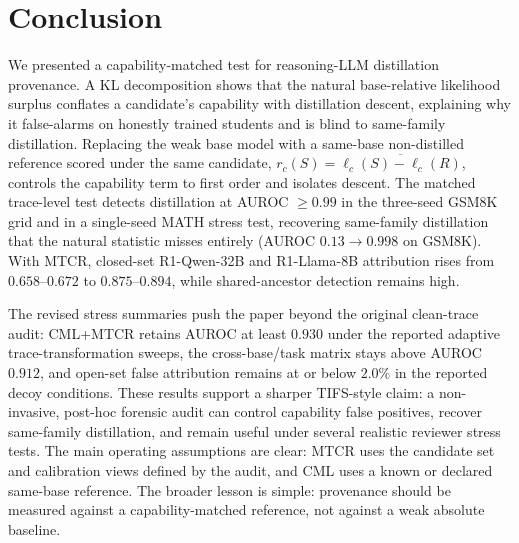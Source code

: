 \section{Conclusion}
\label{sec:conclusion}
We presented a capability-matched test for reasoning-LLM distillation provenance. A
KL decomposition shows that the natural base-relative likelihood surplus conflates a
candidate's capability with distillation descent, explaining why it false-alarms on
honestly trained students and is blind to same-family distillation. Replacing the
weak base model with a same-base non-distilled reference scored under the same
candidate, $r_c(S)=\overline{\ell_c(S)-\ell_c(R)}$, controls the capability term to
first order and isolates descent. The matched trace-level test detects distillation
at AUROC $\geq0.99$ in the three-seed GSM8K grid and in a single-seed MATH stress
test, recovering same-family distillation that the natural statistic misses
entirely (AUROC $0.13\!\to\!0.998$ on GSM8K). With MTCR, closed-set R1-Qwen-32B and
R1-Llama-8B attribution rises from $0.658$--$0.672$ to $0.875$--$0.894$, while
shared-ancestor detection remains high.

The revised stress summaries push the paper beyond the original clean-trace audit:
CML+MTCR retains AUROC at least $0.930$ under the reported adaptive
trace-transformation sweeps, the cross-base/task matrix stays above AUROC $0.912$,
and open-set false attribution remains at or below $2.0\%$ in the reported decoy
conditions. These results support a sharper TIFS-style claim: a non-invasive,
post-hoc forensic audit can control capability false positives, recover same-family
distillation, and remain useful under several realistic reviewer stress tests. The
main operating assumptions are clear: MTCR uses the candidate set and calibration
views defined by the audit, and CML uses a known or declared same-base reference.
The broader lesson is simple: provenance should be
measured against a capability-matched reference, not against a weak absolute
baseline.

